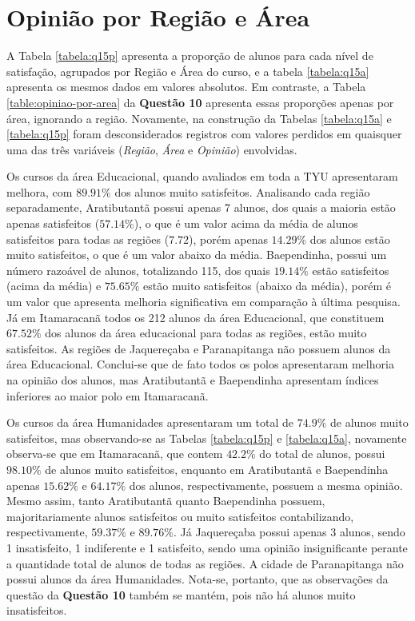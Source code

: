 \documentclass[10pt,a4paper,oneside]{article}
\newcommand{\arat}{Aratibutantã\xspace}
\newcommand{\baep}{Baependinha\xspace}
\newcommand{\itam}{Itamaracanã\xspace}
\newcommand{\jaqu}{Jaquereçaba\xspace}
\newcommand{\para}{Paranapitanga\xspace}
\newcommand{\edu}{Educacional\xspace}
\newcommand{\hum}{Humanidades\xspace}
\begin{document}
\section{Opinião por Região e Área}
\label{section:opiniao-regiao-area}

A Tabela \ref{tabela:q15p} apresenta a proporção de alunos para cada nível de satisfação, agrupados por Região e Área do curso, e a tabela \ref{tabela:q15a} apresenta os mesmos dados em valores absolutos. Em contraste, a Tabela \ref{table:opiniao-por-area} da \textbf{Questão 10} apresenta essas proporções apenas por área, ignorando a região. Novamente, na construção da Tabelas \ref{tabela:q15a} e \ref{tabela:q15p} foram desconsiderados registros com valores perdidos em quaisquer uma das três variáveis (\textit{Região}, \textit{Área} e \textit{Opinião}) envolvidas. 




Os cursos da área \edu, quando avaliados em toda a TYU apresentaram melhora, com $89.91\%$ dos alunos muito satisfeitos. Analisando cada região separadamente, \arat possui apenas 7 alunos, dos quais a maioria estão apenas satisfeitos ($57.14\%$), o que é um valor acima da média de alunos satisfeitos para todas as regiões ($7.72$), porém apenas $14.29\%$ dos alunos estão muito satisfeitos, o que é um valor abaixo da média. \baep, possui um número razoável de alunos, totalizando 115, dos quais $19.14\%$ estão satisfeitos (acima da média) e $75.65\%$ estão muito satisfeitos (abaixo da média), porém é um valor que apresenta melhoria significativa em comparação à última pesquisa. Já em \itam todos os 212 alunos da área \edu, que constituem $67.52\%$ dos alunos da área educacional para todas as regiões, estão muito satisfeitos. As regiões de \jaqu e \para não possuem alunos da área \edu. Conclui-se que de fato todos os polos apresentaram melhoria na opinião dos alunos, mas \arat e \baep apresentam índices inferiores ao maior polo em \itam.

Os cursos da área \hum apresentaram um total de $74.9\%$ de alunos muito satisfeitos, mas observando-se as Tabelas \ref{tabela:q15p} e \ref{tabela:q15a}, novamente observa-se que em \itam, que contem $42.2\%$ do total de alunos, possui  $98.10\%$ de alunos muito satisfeitos, enquanto em \arat e \baep apenas $15.62\%$ e $64.17\%$ dos alunos, respectivamente, possuem a mesma opinião. Mesmo assim, tanto \arat quanto \baep possuem, majoritariamente alunos satisfeitos ou muito satisfeitos contabilizando, respectivamente, $59.37\%$ e $89.76\%$. Já \jaqu possui apenas 3 alunos, sendo 1 insatisfeito, 1 indiferente e 1 satisfeito, sendo uma opinião insignificante perante a quantidade total de alunos de todas as regiões. A cidade de \para não possui alunos da área \hum. Nota-se, portanto, que as observações da questão da \textbf{Questão 10} também se mantém, pois não há alunos muito insatisfeitos.
\end{document}
